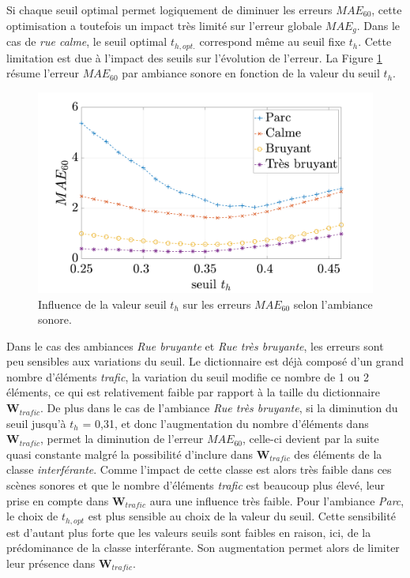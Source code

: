 Si chaque seuil optimal permet logiquement de diminuer les erreurs $MAE_{60}$, cette optimisation a toutefois un impact très limité sur l'erreur globale $MAE_g$. Dans le cas de \textit{rue calme}, le seuil optimal $t_{h,opt.}$ correspond même au seuil fixe $t_h$.
Cette limitation est due à l'impact des seuils sur l'évolution de l'erreur. La Figure \ref{fig:maeExpandSeuil} résume l'erreur $MAE_{60}$ par ambiance sonore en fonction de la valeur du seuil $t_h$. 

\begin{figure}[h]
 \centering
 \includegraphics[width=.7\linewidth]{./figures/resultats/maeExpandseuil.pdf}
 \caption{Influence de la valeur seuil $t_h$ sur les erreurs $MAE_{60}$ selon l'ambiance sonore.}
 \label{fig:maeExpandSeuil}
 \end{figure}
  

Dans le cas des ambiances \textit{Rue bruyante} et \textit{Rue très bruyante}, les erreurs sont peu sensibles aux variations du seuil. Le dictionnaire est déjà composé d'un grand nombre d'éléments \textit{trafic}, la variation du seuil modifie ce nombre de 1 ou 2 éléments, ce qui est relativement faible par rapport à la taille du dictionnaire $\mathbf{W}_{trafic}$. 
De plus dans le cas de l'ambiance \textit{Rue très bruyante}, si la diminution du seuil jusqu'à $t_h$ = 0,31, et donc l'augmentation du nombre d'éléments dans $\mathbf{W}_{trafic}$, permet la diminution de l'erreur $MAE_{60}$, celle-ci devient par la suite quasi constante malgré la possibilité d'inclure dans $\mathbf{W}_{trafic}$ des éléments de la classe \textit{interférante}. 
Comme l'impact de cette classe est alors très faible dans ces scènes sonores et que le nombre d'éléments \textit{trafic} est beaucoup plus élevé, leur prise en compte dans $\mathbf{W}_{trafic}$ aura une influence très faible. 
Pour l'ambiance \textit{Parc}, le choix de $t_{h,opt}$ est plus sensible au choix de la valeur du seuil. Cette sensibilité est d'autant plus forte que les valeurs seuils sont faibles en raison, ici, de la prédominance de la classe interférante. Son augmentation permet alors de limiter leur présence dans $\mathbf{W}_{trafic}$.

